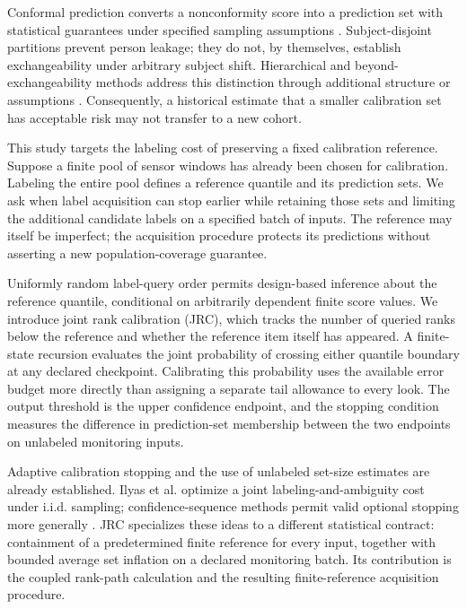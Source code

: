\documentclass[pdflatex,sn-basic,Numbered,iicol]{sn-jnl}
\begin{document}
Conformal prediction converts a nonconformity score into a prediction set with statistical guarantees under specified sampling assumptions \cite{vovk,angelopoulos}. Subject-disjoint partitions prevent person leakage; they do not, by themselves, establish exchangeability under arbitrary subject shift. Hierarchical and beyond-exchangeability methods address this distinction through additional structure or assumptions \cite{dunn,barber}. Consequently, a historical estimate that a smaller calibration set has acceptable risk may not transfer to a new cohort.

This study targets the labeling cost of preserving a fixed calibration reference. Suppose a finite pool of sensor windows has already been chosen for calibration. Labeling the entire pool defines a reference quantile and its prediction sets. We ask when label acquisition can stop earlier while retaining those sets and limiting the additional candidate labels on a specified batch of inputs. The reference may itself be imperfect; the acquisition procedure protects its predictions without asserting a new population-coverage guarantee.

Uniformly random label-query order permits design-based inference about the reference quantile, conditional on arbitrarily dependent finite score values. We introduce joint rank calibration (JRC), which tracks the number of queried ranks below the reference and whether the reference item itself has appeared. A finite-state recursion evaluates the joint probability of crossing either quantile boundary at any declared checkpoint. Calibrating this probability uses the available error budget more directly than assigning a separate tail allowance to every look. The output threshold is the upper confidence endpoint, and the stopping condition measures the difference in prediction-set membership between the two endpoints on unlabeled monitoring inputs.

Adaptive calibration stopping and the use of unlabeled set-size estimates are already established. Ilyas et al. \cite{ilyas} optimize a joint labeling-and-ambiguity cost under i.i.d. sampling; confidence-sequence methods permit valid optional stopping more generally \cite{howard2021,howard2022,wor}. JRC specializes these ideas to a different statistical contract: containment of a predetermined finite reference for every input, together with bounded average set inflation on a declared monitoring batch. Its contribution is the coupled rank-path calculation and the resulting finite-reference acquisition procedure.
\end{document}
